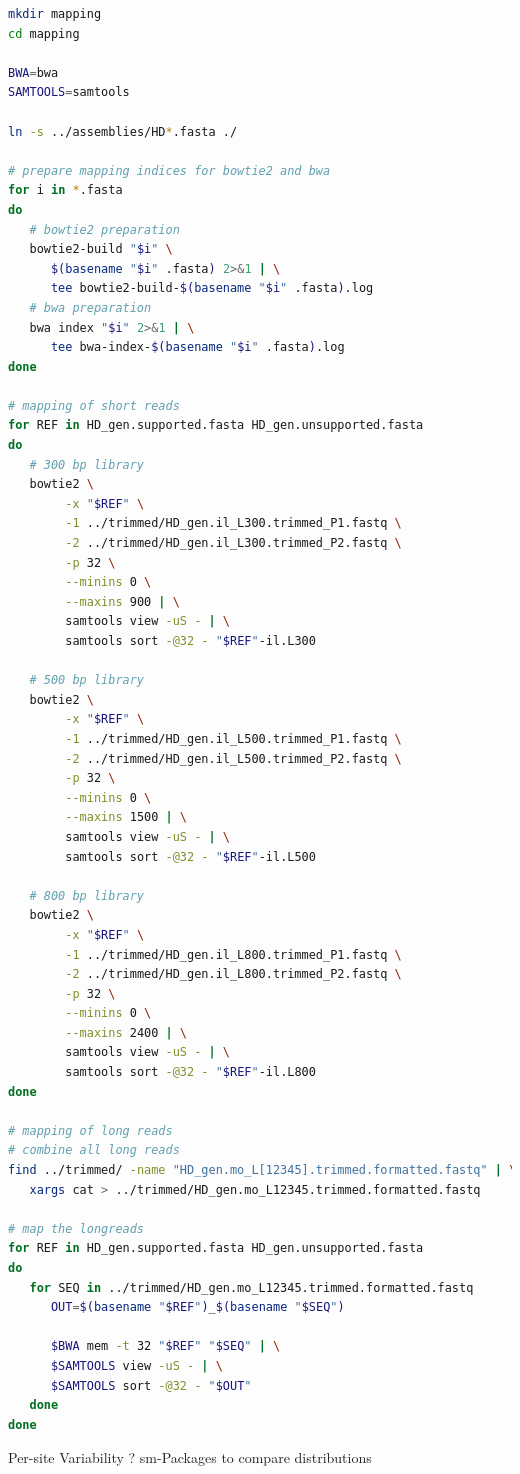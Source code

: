 \documentclass[12pt,a4paper]{scrartcl}
\begin{document}
\begin{lstlisting}[language=bash]
mkdir mapping
cd mapping

BWA=bwa
SAMTOOLS=samtools

ln -s ../assemblies/HD*.fasta ./

# prepare mapping indices for bowtie2 and bwa
for i in *.fasta
do
   # bowtie2 preparation
   bowtie2-build "$i" \
      $(basename "$i" .fasta) 2>&1 | \
      tee bowtie2-build-$(basename "$i" .fasta).log
   # bwa preparation
   bwa index "$i" 2>&1 | \
      tee bwa-index-$(basename "$i" .fasta).log
done

# mapping of short reads
for REF in HD_gen.supported.fasta HD_gen.unsupported.fasta
do
   # 300 bp library
   bowtie2 \
        -x "$REF" \
        -1 ../trimmed/HD_gen.il_L300.trimmed_P1.fastq \
        -2 ../trimmed/HD_gen.il_L300.trimmed_P2.fastq \
        -p 32 \
        --minins 0 \
        --maxins 900 | \
        samtools view -uS - | \
        samtools sort -@32 - "$REF"-il.L300

   # 500 bp library
   bowtie2 \
        -x "$REF" \
        -1 ../trimmed/HD_gen.il_L500.trimmed_P1.fastq \
        -2 ../trimmed/HD_gen.il_L500.trimmed_P2.fastq \
        -p 32 \
        --minins 0 \
        --maxins 1500 | \
        samtools view -uS - | \
        samtools sort -@32 - "$REF"-il.L500

   # 800 bp library
   bowtie2 \
        -x "$REF" \
        -1 ../trimmed/HD_gen.il_L800.trimmed_P1.fastq \
        -2 ../trimmed/HD_gen.il_L800.trimmed_P2.fastq \
        -p 32 \
        --minins 0 \
        --maxins 2400 | \
        samtools view -uS - | \
        samtools sort -@32 - "$REF"-il.L800
done

# mapping of long reads
# combine all long reads
find ../trimmed/ -name "HD_gen.mo_L[12345].trimmed.formatted.fastq" | \
   xargs cat > ../trimmed/HD_gen.mo_L12345.trimmed.formatted.fastq

# map the longreads
for REF in HD_gen.supported.fasta HD_gen.unsupported.fasta
do
   for SEQ in ../trimmed/HD_gen.mo_L12345.trimmed.formatted.fastq
      OUT=$(basename "$REF")_$(basename "$SEQ")

      $BWA mem -t 32 "$REF" "$SEQ" | \
      $SAMTOOLS view -uS - | \
      $SAMTOOLS sort -@32 - "$OUT"
   done
done


\end{lstlisting}

Per-site Variability ?
sm-Packages to compare distributions

\printbibliography
\end{document}
